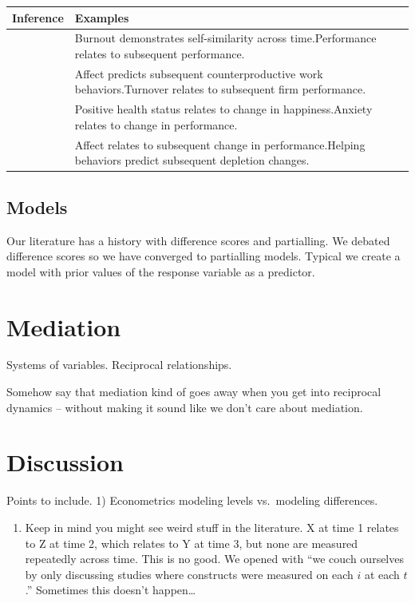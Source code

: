 \documentclass[english,,man]{apa6}
\providecommand{\tightlist}{%
  \setlength{\itemsep}{0pt}\setlength{\parskip}{0pt}}
\theoremstyle{definition}
\theoremstyle{definition}
\theoremstyle{definition}
\theoremstyle{remark}
\begin{document}
\begin{tabular}{>{\raggedright\arraybackslash}p{5em}>{\raggedright\arraybackslash}p{30em}}
\toprule
Inference & Examples\\
\midrule
1 & Burnout demonstrates self-similarity across time.\newline Performance relates to subsequent performance.\\
\hline
2 & Affect predicts subsequent counterproductive work behaviors.\newline Turnover relates to subsequent firm performance.\\
\hline
3 & Positive health status relates to change in happiness.\newline Anxiety relates to change in performance.\\
\hline
4 & Affect relates to subsequent change in performance.\newline Helping behaviors predict subsequent depletion changes.\\
\bottomrule
\end{tabular}

\hypertarget{models-2}{%
\subsection{Models}\label{models-2}}

Our literature has a history with difference scores and partialling. We
debated difference scores so we have converged to partialling models.
Typical we create a model with prior values of the response variable as
a predictor.

\hypertarget{mediation}{%
\section{Mediation}\label{mediation}}

Systems of variables. Reciprocal relationships.

Somehow say that mediation kind of goes away when you get into
reciprocal dynamics -- without making it sound like we don't care about
mediation.

\hypertarget{discussion}{%
\section{Discussion}\label{discussion}}

Points to include. 1) Econometrics modeling levels vs.~modeling
differences.

\begin{enumerate}
\def\labelenumi{\arabic{enumi})}
\setcounter{enumi}{1}
\tightlist
\item
  Keep in mind you might see weird stuff in the literature. X at time 1
  relates to Z at time 2, which relates to Y at time 3, but none are
  measured repeatedly across time. This is no good. We opened with
  \enquote{we couch ourselves by only discussing studies where
  constructs were measured on each \(i\) at each \(t\).} Sometimes this
  doesn't happen\ldots{}
\end{enumerate}
\end{document}
